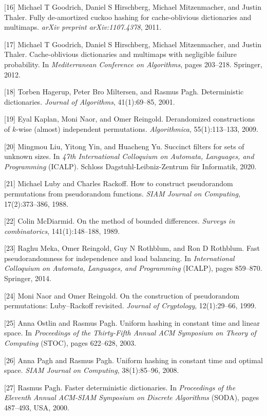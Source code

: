 \documentclass[12pt,a4paper]{ctexart}
\theoremstyle{remark}
\begin{document}
[16] Michael T Goodrich, Daniel S Hirschberg, Michael Mitzenmacher, and Justin Thaler. Fully de-amortized cuckoo hashing for cache-oblivious dictionaries and multimaps. \textit{arXiv preprint arXiv:1107.4378}, 2011.

[17] Michael T Goodrich, Daniel S Hirschberg, Michael Mitzenmacher, and Justin Thaler. Cache-oblivious dictionaries and multimaps with negligible failure probability. In \textit{Mediterranean Conference on Algorithms}, pages 203--218. Springer, 2012.

[18] Torben Hagerup, Peter Bro Miltersen, and Rasmus Pagh. Deterministic dictionaries. \textit{Journal of Algorithms}, 41(1):69--85, 2001.

[19] Eyal Kaplan, Moni Naor, and Omer Reingold. Derandomized constructions of $k$-wise (almost) independent permutations. \textit{Algorithmica}, 55(1):113--133, 2009.

[20] Mingmou Liu, Yitong Yin, and Huacheng Yu. Succinct filters for sets of unknown sizes. In \textit{47th International Colloquium on Automata, Languages, and Programming} (ICALP). Schloss Dagstuhl-Leibniz-Zentrum für Informatik, 2020.

[21] Michael Luby and Charles Rackoff. How to construct pseudorandom permutations from pseudorandom functions. \textit{SIAM Journal on Computing}, 17(2):373--386, 1988.

[22] Colin McDiarmid. On the method of bounded differences. \textit{Surveys in combinatorics}, 141(1):148--188, 1989.

[23] Raghu Meka, Omer Reingold, Guy N Rothblum, and Ron D Rothblum. Fast pseudorandomness for independence and load balancing. In \textit{International Colloquium on Automata, Languages, and Programming} (ICALP), pages 859--870. Springer, 2014.

[24] Moni Naor and Omer Reingold. On the construction of pseudorandom permutations: Luby--Rackoff revisited. \textit{Journal of Cryptology}, 12(1):29--66, 1999.

[25] Anna Ostlin and Rasmus Pagh. Uniform hashing in constant time and linear space. In \textit{Proceedings of the Thirty-Fifth Annual ACM Symposium on Theory of Computing} (STOC), pages 622--628, 2003.

[26] Anna Pagh and Rasmus Pagh. Uniform hashing in constant time and optimal space. \textit{SIAM Journal on Computing}, 38(1):85--96, 2008.

[27] Rasmus Pagh. Faster deterministic dictionaries. In \textit{Proceedings of the Eleventh Annual ACM-SIAM Symposium on Discrete Algorithms} (SODA), pages 487--493, USA, 2000.
\end{document}

